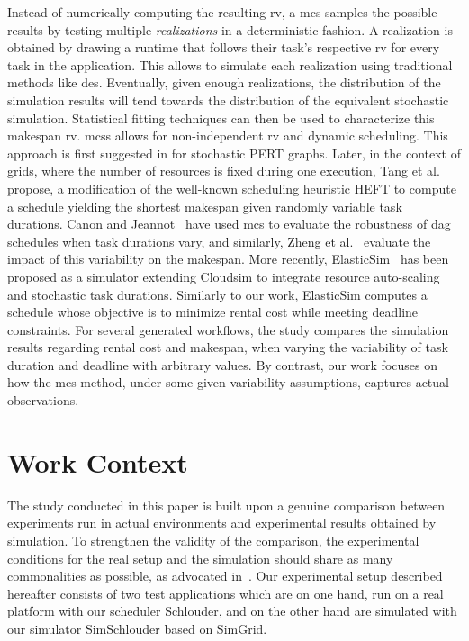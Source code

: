 \documentclass[]{llncs}
\begin{document}
Instead of numerically computing the  resulting \ac{rv}, a \ac{mcs} samples the
possible  results by  testing  multiple \emph{realizations}  in a  deterministic
fashion.  A  realization is  obtained by  drawing a  runtime that  follows their
task's respective  \ac{rv} for every  task in  the application.  This  allows to
simulate each realization using  traditional methods like \ac{des}.  Eventually,
given enough realizations, the distribution  of the simulation results will tend
towards the  distribution of the equivalent  stochastic simulation.  Statistical
fitting   techniques  can   then   be  used   to   characterize  this   makespan
\ac{rv}. \acp{mcs} allows for non-independent \ac{rv} and dynamic
scheduling.
This approach is first suggested in
\cite{Slyke63}  for stochastic  PERT graphs.   
Later, in the  context of grids, where  the number of resources  is fixed during
one execution, Tang et al.~\cite{Tang11} propose, a modification of the well-known
scheduling heuristic HEFT to compute a schedule yielding the shortest makespan
given randomly variable task durations. Canon and Jeannot~\cite{Canon10} have
used \ac{mcs} to evaluate the robustness of \ac{dag}
schedules when task  durations vary, and similarly,  Zheng et al.~\cite{Zheng13}
evaluate  the  impact of  this  variability  on  the makespan.   More  recently,
ElasticSim~\cite{Cai17} has been  proposed as a simulator  extending Cloudsim to
integrate resource auto-scaling and stochastic  task durations. Similarly to our
work, ElasticSim computes a schedule whose  objective is to minimize rental cost
while meeting deadline constraints.  For  several generated workflows, the study
compares the simulation results regarding rental cost and makespan, when varying
the  variability  of task  duration  and  deadline  with arbitrary  values.   By
contrast,  our  work focuses  on  how  the  \ac{mcs}  method, under  some  given
variability assumptions, captures actual observations.


\section{Work Context}
\label{sec:work-context}

The study  conducted in this  paper is built  upon a genuine  comparison between
experiments  run in  actual environments  and experimental  results obtained  by
simulation.   To strengthen  the validity  of the  comparison, the  experimental
conditions  for  the  real  setup  and  the  simulation  should  share  as  many
commonalities as possible, as advocated in~\cite{PucherGWK15}.  Our experimental
setup described hereafter consists of two test applications which are on one
hand, run on a real platform with our scheduler Schlouder, and on the other hand are
simulated with our simulator SimSchlouder based on SimGrid.
\end{document}
